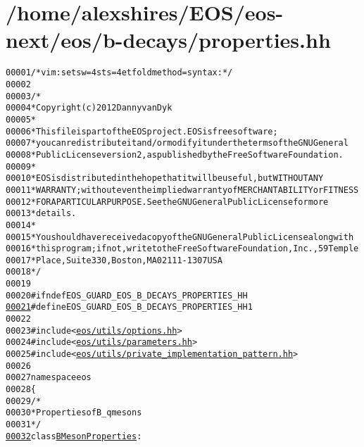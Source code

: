 \hypertarget{properties_8hh_source}{
\section{/home/alexshires/EOS/eos-\/next/eos/b-\/decays/properties.hh}
}


\begin{footnotesize}\begin{alltt}
00001 \textcolor{comment}{/* vim: set sw=4 sts=4 et foldmethod=syntax : */}
00002 
00003 \textcolor{comment}{/*}
00004 \textcolor{comment}{ * Copyright (c) 2012 Danny van Dyk}
00005 \textcolor{comment}{ *}
00006 \textcolor{comment}{ * This file is part of the EOS project. EOS is free software;}
00007 \textcolor{comment}{ * you can redistribute it and/or modify it under the terms of the GNU General}
00008 \textcolor{comment}{ * Public License version 2, as published by the Free Software Foundation.}
00009 \textcolor{comment}{ *}
00010 \textcolor{comment}{ * EOS is distributed in the hope that it will be useful, but WITHOUT ANY}
00011 \textcolor{comment}{ * WARRANTY; without even the implied warranty of MERCHANTABILITY or FITNESS}
00012 \textcolor{comment}{ * FOR A PARTICULAR PURPOSE.  See the GNU General Public License for more}
00013 \textcolor{comment}{ * details.}
00014 \textcolor{comment}{ *}
00015 \textcolor{comment}{ * You should have received a copy of the GNU General Public License along with}
00016 \textcolor{comment}{ * this program; if not, write to the Free Software Foundation, Inc., 59 Temple}
00017 \textcolor{comment}{ * Place, Suite 330, Boston, MA  02111-1307  USA}
00018 \textcolor{comment}{ */}
00019 
00020 \textcolor{preprocessor}{#ifndef EOS\_GUARD\_EOS\_B\_DECAYS\_PROPERTIES\_HH}
\hypertarget{properties_8hh_source_l00021}{}\hyperlink{properties_8hh_ae13950a36229777e5e175c9daa98c106}{00021} \textcolor{preprocessor}{}\textcolor{preprocessor}{#define EOS\_GUARD\_EOS\_B\_DECAYS\_PROPERTIES\_HH 1}
00022 \textcolor{preprocessor}{}
00023 \textcolor{preprocessor}{#include <\hyperlink{options_8hh}{eos/utils/options.hh}>}
00024 \textcolor{preprocessor}{#include <\hyperlink{parameters_8hh}{eos/utils/parameters.hh}>}
00025 \textcolor{preprocessor}{#include <\hyperlink{private__implementation__pattern_8hh}{eos/utils/private_implementation_pattern.hh}>}
00026 
00027 \textcolor{keyword}{namespace }eos
00028 \{
00029     \textcolor{comment}{/*}
00030 \textcolor{comment}{     * Properties of B\_q mesons}
00031 \textcolor{comment}{     */}
\hypertarget{properties_8hh_source_l00032}{}\hyperlink{classeos_1_1BMesonProperties}{00032}     \textcolor{keyword}{class }\hyperlink{classeos_1_1BMesonProperties}{BMesonProperties} :

\end{alltt}
\end{footnotesize}
